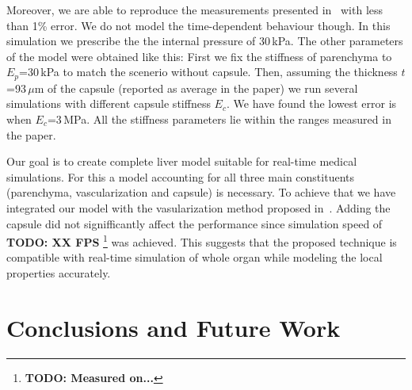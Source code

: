 \documentclass{acm_proc_article-sp}
\newcommand{\TG}[1]{{\color{blue}\textbf{TG: #1}}}
\newcommand{\TODO}[1]{{\color{red}\textbf{TODO: #1}}}
\begin{document}
Moreover, we are able to reproduce
the measurements presented in~\cite{Hollenstein2006,Nava2008} with less than 1\% error.
We do not model the time-dependent behaviour though.
In this simulation we prescribe the the internal pressure of 30\,kPa. The other
parameters of the model were obtained like this: First we fix the stiffness of
parenchyma to $E_p$=30\,kPa to match the scenerio without capsule. Then,
assuming the thickness $t$=93\,$\mu$m of the capsule (reported as average in
the paper) we run several simulations with different capsule stiffness $E_c$.
We have found the lowest error is when $E_c$=3\,MPa. All the stiffness
parameters lie within the ranges measured in the paper.



Our goal is to create complete liver model suitable for real-time medical
simulations. For this a model accounting for all three main constituents
(parenchyma, vascularization and capsule) is necessary. To achieve that we have
integrated our model with the vasularization method proposed
in~\cite{Peterlik2012}. Adding the capsule did not signifficantly affect the
performance since simulation speed of \TODO{XX FPS}%
\footnote{\TODO{Measured on...}} was achieved. This suggests
that the proposed technique is compatible with real-time simulation of whole
organ while modeling the local properties accurately.



\section{Conclusions and Future Work} %
\end{document}

